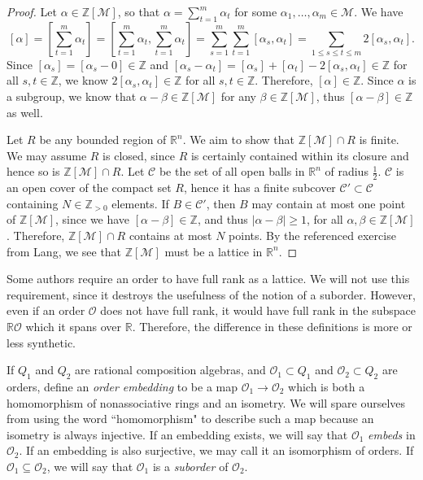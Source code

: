 \documentclass[10pt]{amsart}
\newcommand{\M}{\mathcal{M}}
\newcommand{\Z}{\mathbb{Z}}
\newcommand{\R}{\mathbb{R}}
\newcommand{\Ord}{\mathcal{O}}
\newcommand{\norm}[1]{\left[#1\right]}
\begin{document}
\begin{proof}
Let $\alpha \in \Z[\M]$, so that $\alpha = \sum_{t=1}^m \alpha_t$ for some $\alpha_1, \dots , \alpha_m \in \M$.  We have
$$
\norm{\alpha} = \norm{ \sum_{t=1}^m \alpha_t } = \norm{\sum_{t=1}^m \alpha_t, \sum_{t=1}^m \alpha_t} = \sum_{s=1}^m \sum_{t=1}^m \norm{\alpha_s,\alpha_t} = \sum_{1 \leq s \leq t \leq m} 2\norm{\alpha_s,\alpha_t}.
$$
Since $\norm{\alpha_s} = \norm{\alpha_s - 0} \in \Z$ and $\norm{\alpha_s - \alpha_t} = \norm{\alpha_s} + \norm{\alpha_t} - 2\norm{\alpha_s,\alpha_t} \in \Z$ for all $s,t \in \Z$, we know $2 \norm{\alpha_s,\alpha_t} \in \Z$ for all $s,t \in \Z$.  Therefore, $\norm{\alpha} \in \Z$.  Since $\alpha$ is a subgroup, we know that $\alpha - \beta \in \Z[\M]$ for any $\beta \in \Z[\M]$, thus $\norm{\alpha - \beta} \in \Z$ as well.

Let $R$ be any bounded region of $\R^n$.  We aim to show that $\Z[\M] \cap R$ is finite.  We may assume $R$ is closed, since $R$ is certainly contained within its closure and hence so is $\Z[\M] \cap R$.  Let $\mathcal{C}$ be the set of all open balls in $\R^n$ of radius $\frac12$.  $\mathcal{C}$ is an open cover of the compact set $R$, hence it has a finite subcover $\mathcal{C}' \subset \mathcal{C}$ containing $N \in \Z_{>0}$ elements.  If $B \in \mathcal{C}'$, then $B$ may contain at most one point of $\Z[\M]$, since we have $\norm{\alpha - \beta} \in \Z$, and thus $|\alpha - \beta| \geq 1$, for all $\alpha, \beta \in \Z[\M]$.  Therefore, $\Z[\M] \cap R$ contains at most $N$ points.  By the referenced exercise from Lang, we see that $\Z[\M]$ must be a lattice in $\R^n$.
\end{proof}

Some authors require an order to have full rank as a lattice.  We will not use this requirement, since it destroys the usefulness of the notion of a suborder.  However, even if an order $\Ord$ does not have full rank, it would have full rank in the subspace $\R \Ord$ which it spans over $\R$.  Therefore, the difference in these definitions is more or less synthetic.

If $Q_1$ and $Q_2$ are rational composition algebras, and $\Ord_1 \subset Q_1$ and $\Ord_2 \subset Q_2$ are orders, define an \emph{order embedding} to be a map $\Ord_1 \rightarrow \Ord_2$ which is both a homomorphism of nonassociative rings and an isometry.  We will spare ourselves from using the word ``homomorphism" to describe such a map because an isometry is always injective.  If an embedding exists, we will say that $\Ord_1$ \emph{embeds} in $\Ord_2$.  If an embedding is also surjective, we may call it an isomorphism of orders.  If $\Ord_1 \subseteq \Ord_2$, we will say that $\Ord_1$ is a \emph{suborder} of $\Ord_2$.
\end{document}
